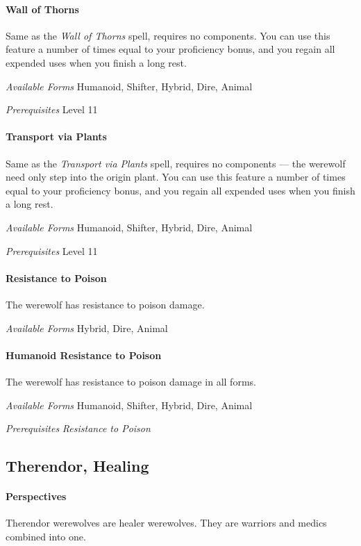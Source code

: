 \documentclass[twocolumn]{dndbook}
\begin{document}
\paragraph*{Wall of Thorns}
Same as the \emph{Wall of Thorns} spell, requires no components.
You can use this feature a number of times equal to your proficiency bonus, and you regain all expended uses when you finish a long rest.\par
\emph{Available Forms} Humanoid, Shifter, Hybrid, Dire, Animal\par
\emph{Prerequisites} Level 11\par

\paragraph*{Transport via Plants}
Same as the \emph{Transport via Plants} spell, requires no components --- the werewolf need only step into the origin plant.
You can use this feature a number of times equal to your proficiency bonus, and you regain all expended uses when you finish a long rest.\par
\emph{Available Forms} Humanoid, Shifter, Hybrid, Dire, Animal\par
\emph{Prerequisites} Level 11\par

\paragraph*{Resistance to Poison}
The werewolf has resistance to poison damage.\par
\emph{Available Forms} Hybrid, Dire, Animal\par

\paragraph*{Humanoid Resistance to Poison}
The werewolf has resistance to poison damage in all forms.\par
\emph{Available Forms} Humanoid, Shifter, Hybrid, Dire, Animal\par
\emph{Prerequisites} \emph{Resistance to Poison}\par


\subsection*{Therendor, Healing}

\paragraph*{Perspectives} Therendor werewolves are healer werewolves.
They are warriors and medics combined into one.\par
\end{document}
